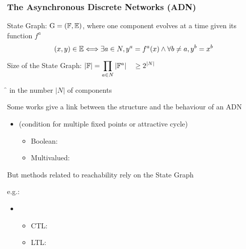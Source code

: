 \begin{frame}[c]
\begin{center}
\bigskip

\end{center}
\end{frame}



\begin{frame}[c]
  \frametitle{The Asynchronous Discrete Networks (ADN)}

State Graph: $\mathrm{G} = (\mathbb{F}, \mathbb{E})$, where one component evolves at a time given its function $f^a$
$$(x, y) \in \mathbb{E} \Longleftrightarrow \exists a \in N, y^a = f^a(x) \wedge \forall b \neq a, y^b = x^b$$


\pause
\medskip
Size of the State Graph: \quad $\displaystyle|\mathbb{F}| = \prod_{a \in N} |\mathbb{F}^a| \quad\geq 2^{|N|}$

\medskip
\f {} in the number $|N|$ of components

\pause
\bigskip
Some works give a link between the structure and the behaviour of an ADN
\begin{itemize}
  \item {} (condition for multiple fixed points or attractive cycle)
  \begin{itemize}
    \item Boolean: 
    \item Multivalued: 
  \end{itemize}
\end{itemize}

\pause
\medskip
But methods related to reachability rely on the State Graph

e.g.: 
\begin{itemize}
  \item {}
  \begin{itemize}
    \item CTL: 
    \item LTL: 
  \end{itemize}
\end{itemize}
\end{frame}
